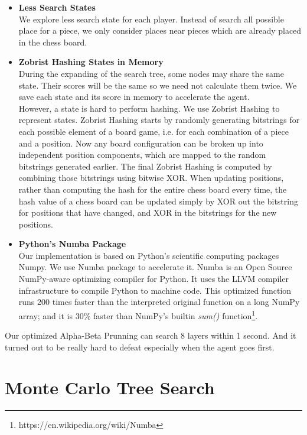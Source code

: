 \documentclass[12pt,a4paper]{article}
\begin{document}
\begin{itemize}
\item \textbf{Less Search States}\\
We explore less search state for each player. Instead of search all possible place for a piece, we only consider places near pieces which are already placed in the chess board.
\item \textbf{Zobrist Hashing States in Memory}\\
During the expanding of the search tree, some nodes may share the same state. Their scores will be the same so we need not calculate them twice. We save each state and its score in memory to accelerate the agent.\\
However, a state is hard to perform hashing. We use Zobrist Hashing to represent states. Zobrist Hashing starts by randomly generating bitstrings for each possible element of a board game, i.e. for each combination of a piece and a position. Now any board configuration can be broken up into independent position components, which are mapped to the random bitstrings generated earlier. The final Zobrist Hashing is computed by combining those bitstrings using bitwise XOR. When updating positions, rather than computing the hash for the entire chess board every time, the hash value of a chess board can be updated simply by XOR out the bitstring for positions that have changed, and XOR in the bitstrings for the new positions.
\item \textbf{Python's Numba Package}\\
Our implementation is based on Python's scientific computing packages Numpy. We use Numba package to accelerate it. Numba is an Open Source NumPy-aware optimizing compiler for Python. It uses the LLVM compiler infrastructure to compile Python to machine code. This optimized function runs 200 times faster than the interpreted original function on a long NumPy array; and it is 30\% faster than NumPy's builtin \emph{sum()} function\footnote{https://en.wikipedia.org/wiki/Numba}.

\end{itemize}

Our optimized Alpha-Beta Prunning can search 8 layers within 1 second. And it turned out to be really hard to defeat especially when the agent goes first.

\section{Monte Carlo Tree Search}
\end{document}
